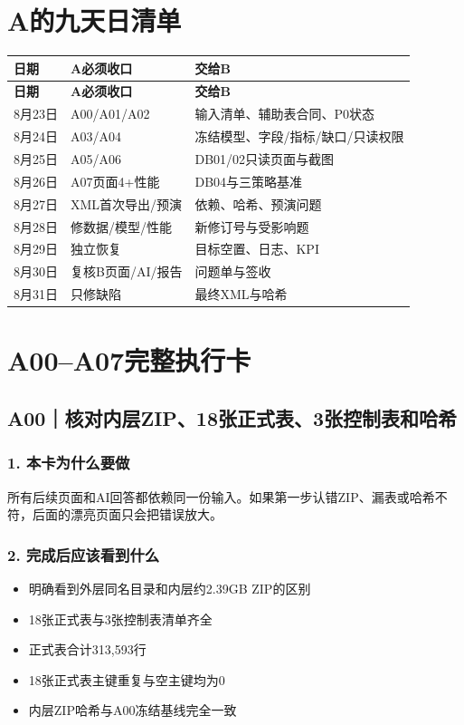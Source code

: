 \documentclass[UTF8,openany,zihao=-4]{ctexbook}
\renewcommand{\_}{\textunderscore\allowbreak}
\begin{document}
\chapter{A的九天日清单}
\begin{longtable}{@{}p{}p{}p{}@{}}
\toprule
\textbf{日期} & \textbf{A必须收口} & \textbf{交给B} \\
\midrule
\endfirsthead
\toprule
\textbf{日期} & \textbf{A必须收口} & \textbf{交给B} \\
\midrule
\endhead
8月23日 & A00/A01/A02 & 输入清单、辅助表合同、P0状态 \\
8月24日 & A03/A04 & 冻结模型、字段/指标/缺口/只读权限 \\
8月25日 & A05/A06 & DB01/02只读页面与截图 \\
8月26日 & A07页面4+性能 & DB04与三策略基准 \\
8月27日 & XML首次导出/预演 & 依赖、哈希、预演问题 \\
8月28日 & 修数据/模型/性能 & 新修订号与受影响题 \\
8月29日 & 独立恢复 & 目标空置、日志、KPI \\
8月30日 & 复核B页面/AI/报告 & 问题单与签收 \\
8月31日 & 只修缺陷 & 最终XML与哈希 \\
\bottomrule
\end{longtable}
\chapter{A00--A07完整执行卡}
\section{A00｜核对内层ZIP、18张正式表、3张控制表和哈希}
\subsection*{1. 本卡为什么要做}
所有后续页面和AI回答都依赖同一份输入。如果第一步认错ZIP、漏表或哈希不符，后面的漂亮页面只会把错误放大。


\subsection*{2. 完成后应该看到什么}
\begin{itemize}
\item 明确看到外层同名目录和内层约2.39GB ZIP的区别
\item 18张正式表与3张控制表清单齐全
\item 正式表合计313,593行
\item 18张正式表主键重复与空主键均为0
\item 内层ZIP哈希与A00冻结基线完全一致
\end{itemize}
\end{document}
